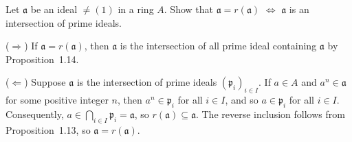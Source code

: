 \begin{exercise}
Let \(\mathfrak{a}\) be an ideal \(\neq (1)\) in a ring \(A\).
Show that \(\mathfrak{a} = r(\mathfrak{a})\) \(\iff\) \(\mathfrak{a}\) is an intersection of prime ideals.
\end{exercise}

\begin{solution}
(\(\Rightarrow\))
If \(\mathfrak{a} = r(\mathfrak{a})\), then \(\mathfrak{a}\) is the intersection of all prime ideal containing \(\mathfrak{a}\) by Proposition~1.14.

(\(\Leftarrow\))
Suppose \(\mathfrak{a}\) is the intersection of prime ideals \((\mathfrak{p}_i)_{i \in I}\).
If \(a \in A\) and \(a^n \in \mathfrak{a}\) for some positive integer \(n\), then \(a^n \in \mathfrak{p}_i\) for all \(i \in I\), and so \(a \in \mathfrak{p}_i\) for all \(i \in I\).
Consequently, \(a \in \bigcap_{i \in I} \mathfrak{p}_i = \mathfrak{a}\), so \(r(\mathfrak{a}) \subseteq \mathfrak{a}\).
The reverse inclusion follows from Proposition~1.13, so \(\mathfrak{a} = r(\mathfrak{a})\).
\end{solution}